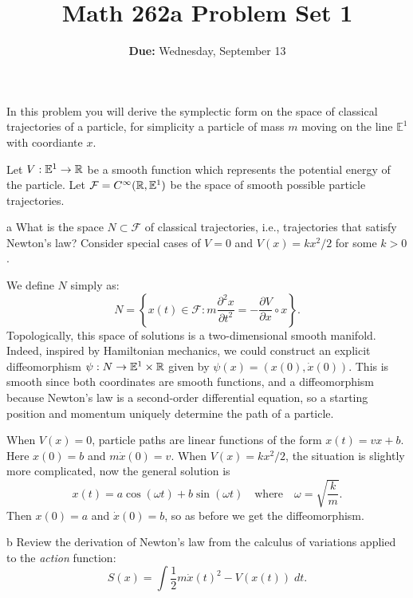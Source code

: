 \documentclass{pset}
\title{\textbf{Math 262a Problem Set 1}}
\date{\textbf{Due:} Wednesday, September 13}
\providecommand{\E}{\mathbb{E}}
\begin{document}
\maketitle

\begin{problem}
    In this problem you will derive the symplectic form on the space of classical trajectories of a particle, for simplicity a particle of mass $m$ moving on the line $\E^1$ with coordiante $x$.
\end{problem}

\begin{solution}
    \quad Let $V : \E^1 \to \R$ be a smooth function which represents the potential energy of the particle. Let $\mathcal{F} = C^\infty(\R, \E^1)$ be the space of smooth possible particle trajectories.

    \begin{part}{a}
        What is the space $N\subset \mathcal{F}$ of classical trajectories, i.e., trajectories that satisfy Newton's law? Consider special cases of $V=0$ and $V(x)=kx^2 / 2$ for some $k > 0$.
    \end{part}

    \quad We define $N$ simply as:
    \[
        N = \left\{x(t) \in \mathcal{F} : m\frac{\partial^2 x}{\partial t^2} = - \frac{\partial V}{\partial x}\circ x \right\}
    .\] 
    Topologically, this space of solutions is a two-dimensional smooth manifold. Indeed, inspired by Hamiltonian mechanics, we could construct an explicit diffeomorphism $\psi : N \to \E^1\times \R$ given by $\psi(x) = (x(0), \dot{x}(0))$. This is smooth since both coordinates are smooth functions, and a diffeomorphism because Newton's law is a second-order differential equation, so a starting position and momentum uniquely determine the path of a particle.

    \quad When $V(x)=0$, particle paths are linear functions of the form $x(t) = vx + b$. Here $x(0)=b$ and $m\dot{x}(0)=v$. When $V(x)=kx^2 / 2$, the situation is slightly more complicated, now the general solution is 
    \[
        x(t) = a\cos\left(\omega t\right)+b\sin\left(\omega t\right)\quad\textrm{where}\quad \omega = \sqrt{\frac{k}{m}}
    .\]
    Then $x(0) = a$ and $\dot{x}(0) = b$, so as before we get the diffeomorphism.

    \begin{part}{b}
        Review the derivation of Newton's law from the calculus of variations applied to the \emph{action} function:
        \[
            S(x) = \int \frac{1}{2} m\dot{x}(t)^2 - V(x(t)) \;dt
        .\] 
    \end{part}


\end{solution}
\end{document}
